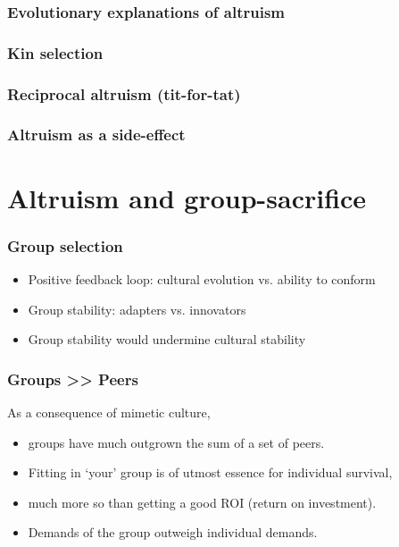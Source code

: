 \documentclass{beamer}
\begin{document}
\begin{frame}
  \frametitle{Evolutionary explanations of altruism}

  
\end{frame}

\begin{frame}
  \frametitle{Kin selection}
\end{frame}

\begin{frame}
  \frametitle{Reciprocal altruism (tit-for-tat)}
\end{frame}

\begin{frame}
  \frametitle{Altruism as a side-effect}
\end{frame}

\section{Altruism and group-sacrifice}

\begin{frame}
  \frametitle{Group selection}
  
  \begin{itemize}
    \item Positive feedback loop: cultural evolution vs. ability to conform
    \item Group stability: adapters vs. innovators
    \item Group stability would undermine cultural stability
  \end{itemize}
\end{frame}

\begin{frame}
  \frametitle{Groups >> Peers}
  
  As a consequence of mimetic culture,
  
  \begin{itemize}
    \item groups have much outgrown the sum of a set of peers.
    \item Fitting in `your' group is of utmost essence for individual survival,
    \item much more so than getting a good ROI (return on investment).
    \item Demands of the group outweigh individual demands.
  \end{itemize}
\end{frame}
\end{document}

